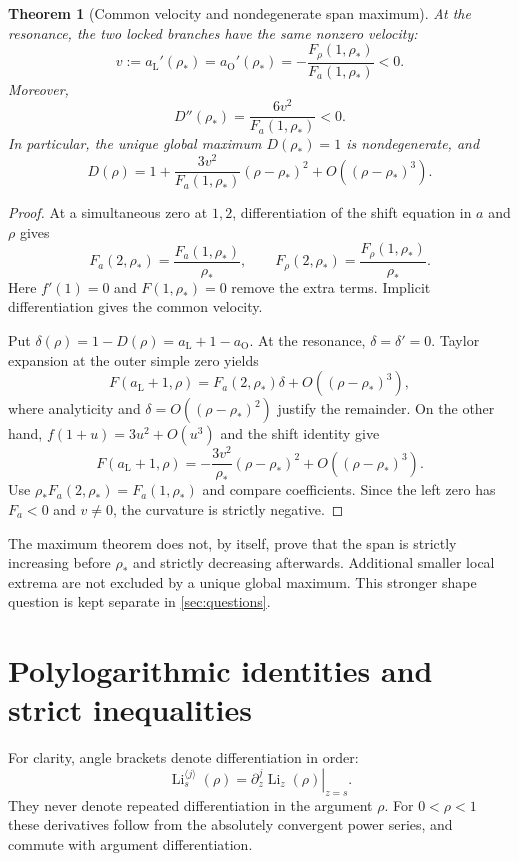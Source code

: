\documentclass[11pt]{article}
\numberwithin{equation}{section}
\newtheorem{theorem}{Theorem}[section]
\theoremstyle{definition}
\newcommand{\Li}{\operatorname{Li}}
\newcommand{\rs}{\rho_*}
\newcommand{\aL}{a_{\mathrm L}}
\newcommand{\aO}{a_{\mathrm O}}
\newcommand{\ordli}[2]{\Li_{#1}^{\langle #2\rangle}}
\begin{document}
\begin{theorem}[Common velocity and nondegenerate span maximum]\label{thm:curvature}
At the resonance, the two locked branches have the same nonzero velocity:
\begin{equation}\label{eq:velocitylock}
 v:=\aL'(\rs)=\aO'(\rs)
   =-\frac{F_\rho(1,\rs)}{F_a(1,\rs)}<0.
\end{equation}
Moreover,
\begin{equation}\label{eq:curvature}
 D''(\rs)=\frac{6v^2}{F_a(1,\rs)}<0.
\end{equation}
In particular, the unique global maximum $D(\rs)=1$ is nondegenerate, and
\begin{equation}\label{eq:spantaylor}
 D(\rho)=1+\frac{3v^2}{F_a(1,\rs)}(\rho-\rs)^2
                    +O((\rho-\rs)^3).
\end{equation}
\end{theorem}
\begin{proof}
At a simultaneous zero at $1,2$, differentiation of the shift equation
in $a$ and $\rho$ gives
\[
 F_a(2,\rs)=\frac{F_a(1,\rs)}{\rs},\qquad
 F_\rho(2,\rs)=\frac{F_\rho(1,\rs)}{\rs}.
\]
Here $f'(1)=0$ and $F(1,\rs)=0$ remove the extra terms. Implicit
differentiation gives the common velocity.

Put $\delta(\rho)=1-D(\rho)=\aL+1-\aO$. At the resonance,
$\delta=\delta'=0$. Taylor expansion at the outer simple zero yields
\[
 F(\aL+1,\rho)=F_a(2,\rs)\delta+O((\rho-\rs)^3),
\]
where analyticity and $\delta=O((\rho-\rs)^2)$ justify the remainder.
On the other hand,
$f(1+u)=3u^2+O(u^3)$ and the shift identity give
\[
 F(\aL+1,\rho)=-\frac{3v^2}{\rs}(\rho-\rs)^2
                         +O((\rho-\rs)^3).
\]
Use $\rs F_a(2,\rs)=F_a(1,\rs)$ and compare coefficients. Since the
left zero has $F_a<0$ and $v\ne0$, the curvature is strictly negative.
\end{proof}

The maximum theorem does not, by itself, prove that the span is strictly
increasing before $\rs$ and strictly decreasing afterwards. Additional
smaller local extrema are not excluded by a unique global maximum. This
stronger shape question is kept separate in \cref{sec:questions}.

\section{Polylogarithmic identities and strict inequalities}
\label{sec:polylog}
For clarity, angle brackets denote differentiation in order:
\[
 \ordli{s}{j}(\rho)=\left.\partial_z^j\Li_z(\rho)\right|_{z=s}.
\]
They never denote repeated differentiation in the argument $\rho$.
For $0<\rho<1$ these derivatives follow from the absolutely convergent
power series, and commute with argument differentiation.
\end{document}
